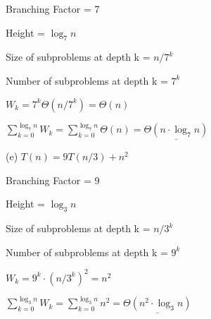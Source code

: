 \documentclass{article} %
\begin{document}
    \hspace{13pt} Branching Factor = 7
    
    \hspace{13pt} Height = $\log_7n $

    \hspace{13pt} Size of subproblems at depth k = $n / 7^k$
    
    \hspace{13pt} Number of subproblems at depth k = $7^k$

    \hspace{13pt} $W_k = 7^k \Theta(n/7^k) = \Theta(n)$

    \hspace{13pt} $\sum^{\log_7 n}_{k = 0} W_k = \sum^{\log_7 n}_{k = 0} \Theta(n) = \underline{\Theta(n \cdot \log_7n)}$

    \vspace{5pt}

    (e) $T(n) = 9T(n / 3) + n^2$

    \hspace{13pt} Branching Factor = 9
    
    \hspace{13pt} Height = $\log_3n $

    \hspace{13pt} Size of subproblems at depth k = $n / 3^k$
    
    \hspace{13pt} Number of subproblems at depth k = $9^k$

    \hspace{13pt} $W_k = 9^k \cdot (n/3^k)^2 = n^2$

    \hspace{13pt} $\sum^{\log_3 n}_{k = 0} W_k = \sum^{\log_3 n}_{k = 0} n^2 = \underline{\Theta(n^2 \cdot \log_3n)}$
\end{document}
